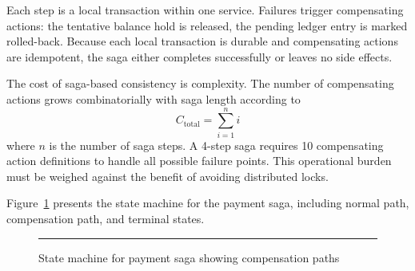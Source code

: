 Each step is a local transaction within one service. Failures trigger compensating actions: the tentative balance hold is released, the pending ledger entry is marked rolled-back. Because each local transaction is durable and compensating actions are idempotent, the saga either completes successfully or leaves no side effects.

The cost of saga-based consistency is complexity. The number of compensating actions grows combinatorially with saga length according to
\begin{equation}
\label{eq:saga-compensation-cost}
C_{\text{total}} = \sum_{i=1}^{n} i
\end{equation}
where $n$ is the number of saga steps. A 4-step saga requires 10 compensating action definitions to handle all possible failure points. This operational burden must be weighed against the benefit of avoiding distributed locks.

Figure~\ref{fig:saga-state-machine} presents the state machine for the payment saga, including normal path, compensation path, and terminal states.

\begin{figure}[htbp]
\centering
\rule{0.8\textwidth}{0.4\textwidth}
\caption{State machine for payment saga showing compensation paths}
\label{fig:saga-state-machine}
\end{figure}
